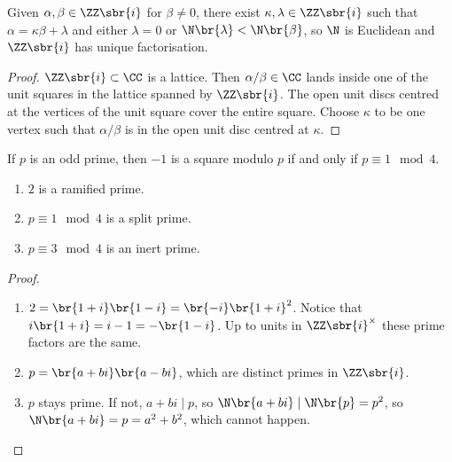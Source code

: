 \begin{theorem}
Given $ \alpha, \beta \in \ZZ\sbr{i} $ for $ \beta \ne 0 $, there exist $ \kappa, \lambda \in \ZZ\sbr{i} $ such that $ \alpha = \kappa\beta + \lambda $ and either $ \lambda = 0 $ or $ \N\br{\lambda} < \N\br{\beta} $, so $ \N $ is Euclidean and $ \ZZ\sbr{i} $ has unique factorisation.
\end{theorem}

\begin{proof}
$ \ZZ\sbr{i} \subset \CC $ is a lattice. Then $ \alpha / \beta \in \CC $ lands inside one of the unit squares in the lattice spanned by $ \ZZ\sbr{i} $. The open unit discs centred at the vertices of the unit square cover the entire square. Choose $ \kappa $ to be one vertex such that $ \alpha / \beta $ is in the open unit disc centred at $ \kappa $.
\end{proof}

\begin{lemma}
If $ p $ is an odd prime, then $ -1 $ is a square modulo $ p $ if and only if $ p \equiv 1 \mod 4 $.
\end{lemma}

\begin{theorem}
\hfill
\begin{enumerate}
\item $ 2 $ is a ramified prime.
\item $ p \equiv 1 \mod 4 $ is a split prime.
\item $ p \equiv 3 \mod 4 $ is an inert prime.
\end{enumerate}
\end{theorem}

\begin{proof}
\hfill
\begin{enumerate}
\item $ 2 = \br{1 + i}\br{1 - i} = \br{-i}\br{1 + i}^2 $. Notice that $ i\br{1 + i} = i - 1 = -\br{1 - i} $. Up to units in $ \ZZ\sbr{i}^\times $ these prime factors are the same.
\item $ p = \br{a + bi}\br{a - bi} $, which are distinct primes in $ \ZZ\sbr{i} $.
\item $ p $ stays prime. If not, $ a + bi \mid p $, so $ \N\br{a + bi} \mid \N\br{p} = p^2 $, so $ \N\br{a + bi} = p = a^2 + b^2 $, which cannot happen.
\end{enumerate}
\end{proof}

